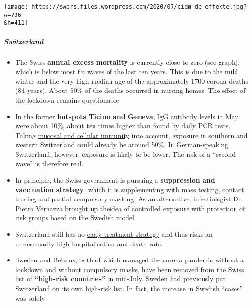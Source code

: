 \texttt{[image: https://swprs.files.wordpress.com/2020/07/cidm-de-effekte.jpg?w=736\\\&h=411]}

\hypertarget{switzerland}{%
\subparagraph{\texorpdfstring{\textbf{Switzerland}}{Switzerland}}\label{switzerland}}

\begin{itemize}
\tightlist
\item
  The Swiss \textbf{annual excess mortality} is currently close to zero
  (see graph), which is below most flu waves of the last ten years. This
  is due to the mild winter and the very high median age of the
  approximately 1700 corona deaths (84 years). About 50\% of the deaths
  occurred in nursing homes. The effect of the lockdown remains
  questionable.
\item
  In the former \textbf{hotspots Ticino and Geneva}, IgG antibody levels
  in May
  \href{https://infekt.ch/2020/07/sind-es-doch-10x-mehr-covid-19-faelle/}{were
  about 10\%}, about ten times higher than found by daily PCR tests.
  Taking
  \href{https://swprs.org/coronavirus-antibody-tests-show-only-one-fifth-of-infections/}{mucosal
  and cellular immunity} into account, exposure in southern and western
  Switzerland could already be around 50\%. In German-speaking
  Switzerland, however, exposure is likely to be lower. The risk of a
  ``second wave'' is therefore real.
\item
  In principle, the Swiss government is pursuing a \textbf{suppression
  and vaccination strategy}, which it is supplementing with mass
  testing, contact tracing and partial compulsory masking. As an
  alternative, infectiologist Dr. Pietro Vernazza brought up
  the\href{https://corona-transition.org/der-infektiologe-prof-pietro-vernazza-sieht-covid-19-im-bereich-einer}{idea
  of controlled exposure} with protection of risk groups based on the
  Swedish model.
\item
  Switzerland still has no
  \href{https://swprs.org/on-the-treatment-of-covid-19/}{early treatment
  strategy} and thus risks an unnecessarily high hospitalisation and
  death rate.
\item
  Sweden and Belarus, both of which managed the corona pandemic without
  a lockdown and without compulsory masks,
  \href{https://www.nau.ch/news/schweiz/42-lander-schweiz-hat-liste-der-corona-risikolander-erweitert-65747991}{have
  been removed} from the Swiss list of \textbf{``high-risk countries''}
  in mid-July. Sweden had previously put Switzerland on its own
  high-risk list. In fact, the increase in Swedish ``cases'' was solely

\end{itemize}
